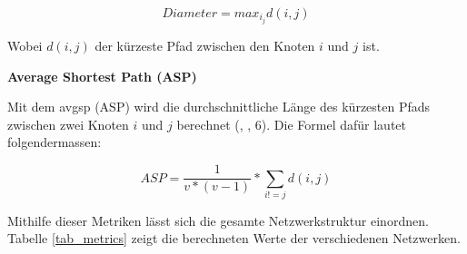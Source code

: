 \begin{equation}
    \label{eq:diameter}
    Diameter = max_i_jd(i,j)
\end{equation}

Wobei $d(i,j)$ der kürzeste Pfad zwischen den Knoten $i$ und $j$ ist.

\textbf{Average Shortest Path (ASP)}

Mit dem \acs{avgsp} (ASP) wird die durchschnittliche Länge des kürzesten Pfads zwischen zwei Knoten $i$ und $j$ berechnet (\citeauthor{gao_link_2015}, \citeyear{gao_link_2015}, 6).
Die Formel dafür lautet folgendermassen:

\begin{equation}
    \label{eq:asp}
    ASP = \frac{1}{v * (v - 1)} * \sum\limits_{i!=j} d(i,j)
\end{equation}

Mithilfe dieser Metriken lässt sich die gesamte Netzwerkstruktur einordnen.
Tabelle \ref{tab_metrics} zeigt die berechneten Werte der verschiedenen Netzwerken.

\begin{table}[h]
    \centering
    \caption{Metrikwerte der Netzwerke}
    \label{tab_metrics}
\end{table}
